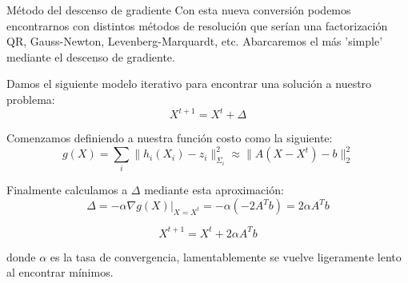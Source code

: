 \documentclass[10pt]{beamer}
\begin{document}
        \begin{frame}{Método del descenso de gradiente}
            Con esta nueva conversión podemos encontrarnos con distintos métodos de resolución que serían una factorización QR, 
            Gauss-Newton, Levenberg-Marquardt, etc. Abarcaremos el más 'simple' mediante el descenso de gradiente.
            \vspace{0.3 cm}

            Damos el siguiente modelo iterativo para encontrar una solución a nuestro problema:
            \[
            X^{t+1} = X^t + \Delta
            \]

            Comenzamos definiendo a nuestra función costo como la siguiente:
            \[
            g(X) = \sum_i \|h_i(X_i) - z_i\|^2_{\Sigma_i} \approx \|A(X - X^t) - b\|^2_2
            \]
            
            Finalmente calculamos a $\Delta$ mediante esta aproximación:
            \[
            \Delta = - \alpha \nabla \left. g(X) \right|_{X = X^t} = - \alpha \left(-2 A^T b\right) = 2 \alpha A^Tb 
            \]
            
            \[
            X^{t+1} = X^t + 2 \alpha A^Tb 
            \]

            donde $\alpha$ es la tasa de convergencia, lamentablemente se vuelve ligeramente lento al encontrar mínimos.
        \end{frame}
\end{document}
